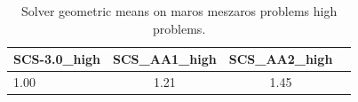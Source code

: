 \begin{table}
\centering
\caption{Solver geometric means on maros meszaros problems high problems.}
\label{t-maros meszaros problems high-geom_mean}
\begin{tabular}{lccc}
\toprule
 SCS-3.0\_high &  SCS\_AA1\_high &  SCS\_AA2\_high \\
\midrule
         1.00 &          1.21 &          1.45 \\
\bottomrule
\end{tabular}
\end{table}
